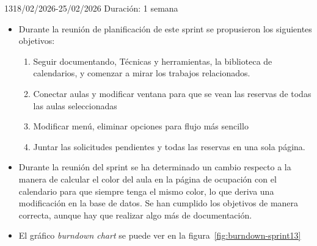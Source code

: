 \begin{Sprint}{13}{18/02/2026-25/02/2026}
	Duración: 1 semana
	\begin{itemize}	
		\item{}
		Durante la reunión de planificación de este sprint se propusieron los siguientes objetivos:
		\begin{enumerate}
			\item Seguir documentando, Técnicas y herramientas, la biblioteca de calendarios, y comenzar a mirar los trabajos relacionados.
			\item Conectar aulas y modificar ventana para que se vean las reservas de todas las aulas seleccionadas
			\item Modificar menú, eliminar opciones para flujo más sencillo
			\item Juntar las solicitudes pendientes y todas las reservas en una sola página.
		\end{enumerate}
		\item{} 
		Durante la reunión del sprint se ha determinado un cambio respecto a la manera de calcular el color del aula en la página de ocupación con el calendario para que siempre tenga el mismo color, lo que deriva una modificación en la base de datos. Se han cumplido los objetivos de manera correcta, aunque hay que realizar algo más de documentación.
		
		\item{}
		El gráfico \textit{burndown chart} se puede ver en la figura~\ref{fig:burndown-sprint13}
	\end{itemize}
\end{Sprint}

